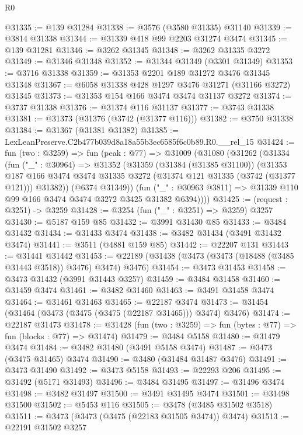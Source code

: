 \begin{lexlean}{R0}
\begin{coremodule}
@31335 := @139 @31284
@31338 := @3576 (@3580 @31335) @31140
@31339 := @3814 @31338
@31344 := @31339 @418 @99 @2203 @31274 @3474
@31345 := @139 @31281
@31346 := @3262 @31345
@31348 := @3262 @31335 @3272
@31349 := @31346 @31348
@31352 := @31344 @31349 (@3301 @31349)
@31353 := @3716 @31338
@31359 := @31353 @2201 @189 @31272 @3476 @31345 @31348
@31367 := @6058 @31338 @428 @1297 @3476 @31271 (@31166 @3272) @31345
@31373 := @31353 @154 @166 @3474 @3474 @31137 @3272
@31374 := @3737 @31338
@31376 := @31374 @116 @31137
@31377 := @3743 @31338
@31381 := @31373 (@31376 (@3742 (@31377 @116)))
@31382 := @3750 @31338
@31384 := @31367 (@31381 @31382)
@31385 := LexLeanPreserve.C2b477b039d8a18a55b3ec6585f6c0b89.R0.__rel_15
@31424 := fun (two : @3259) =>
  fun (peak : @77) =>
  @31009
    (@31080
      (@31262
        (@31334
          (fun ("_" : @30964) =>
          @31352
            (@31359
              (@31384 (@31385 @31100))
              (@31353
                @187
                @166
                @3474
                @3474
                @31335
                @3272
                (@31374 @121 @31335 (@3742 (@31377 @121)))
                @31382))
            (@6374 @31349))
          (fun ("_" : @30963 @3811) => @31339 @110 @99 @166 @3474 @3474 @3272 @3425 @31382 @6394))))
@31425 := (request : @3251) -> @3259
@31428 := @3254 (fun ("_" : @3251) => @3259) @3257
@31430 := @5187 @159 @85
@31432 := @3991 @31430 @85
@31433 := @3484 @31432
@31434 := @31433 @3474
@31438 := @3482 @31434 (@3491 @31432 @3474)
@31441 := @3511 (@4881 @159 @85)
@31442 := @22207 @131
@31443 := @31441 @31442
@31453 := @22189 (@31438 (@3473 (@3473 (@18488 (@3485 @31443 @3518)) @3476) @3474) @3476)
@31454 := @3473 @31453
@31458 := @3473 @31432 (@3991 @31443 @3257)
@31459 := @3484 @31458
@31460 := @31459 @3474
@31461 := @3482 @31460
@31463 := @3491 @31458 @3474
@31464 := @31461 @31463
@31465 := @22187 @3474
@31473 := @31454 (@31464 (@3473 (@3475 (@3475 (@22187 @31465))) @3474) @3476)
@31474 := @22187 @31473
@31478 := @31428 (fun (two : @3259) => fun (bytes : @77) => fun (blocks : @77) => @31474)
@31479 := @3484 @5158
@31480 := @31479 @3474
@31484 := @3482 @31480 (@3491 @5158 @3474)
@31487 := @3473 (@3475 @31465) @3474
@31490 := @3480 (@31484 @31487 @3476)
@31491 := @3473 @31490
@31492 := @3473 @5158
@31493 := @22293 @206
@31495 := @31492 (@5171 @31493)
@31496 := @3484 @31495
@31497 := @31496 @3474
@31498 := @3482 @31497
@31500 := @3491 @31495 @3474
@31501 := @31498 @31500
@31502 := @5453 @116
@31505 := @3478 (@3485 @31502 @3518)
@31511 := @3473 (@3473 (@3475 (@22183 @31505 @3474)) @3474)
@31513 := @22191 @31502 @3257

\end{coremodule}
\end{lexlean}
